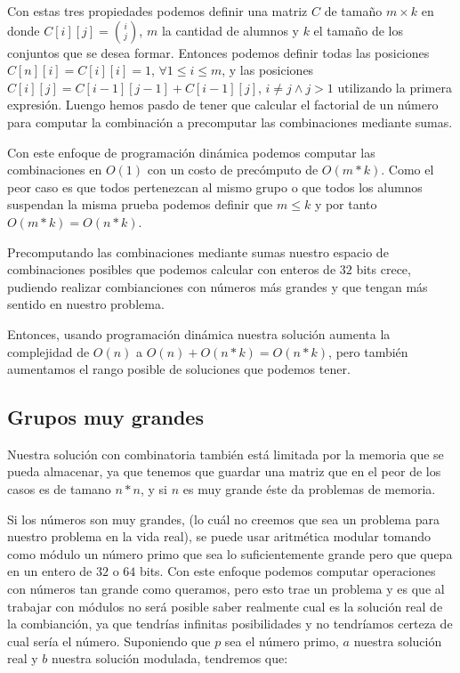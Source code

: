 \documentclass{article}
\begin{document}
Con estas tres propiedades podemos definir una matriz $C$ de tamaño $m \times k$ en donde $C[i][j] = {i \choose j}$, $m$ la cantidad de alumnos y $k$ el tamaño de los conjuntos que se desea formar. Entonces podemos definir todas las posiciones $C[n][i] = C[i][i] = 1$, $\forall 1 \leq i \leq m$, y las posiciones $C[i][j] = C[i - 1][j - 1] + C[i - 1][j]$, $i \neq j \land j > 1$ utilizando la primera expresión. Luengo hemos pasdo de tener que calcular el factorial de un número para computar la combinación a precomputar las combinaciones mediante sumas. 

Con este enfoque de programación dinámica podemos computar las combinaciones en $O(1)$ con un costo de precómputo de $O(m*k)$. Como el peor caso es que todos pertenezcan al mismo grupo o que todos los alumnos suspendan la misma prueba podemos definir que $m \leq k$ y por tanto $O(m*k) = O(n*k)$. 

Precomputando las combinaciones mediante sumas nuestro espacio de combinaciones posibles que podemos calcular con enteros de $32$ bits crece, pudiendo realizar combianciones con números más grandes y que tengan más sentido en nuestro problema.  

Entonces, usando programación dinámica nuestra solución aumenta la complejidad de $O(n)$ a $O(n) + O(n*k) = O(n*k)$, pero también aumentamos el rango posible de soluciones que podemos tener.

\subsection{Grupos muy grandes}

Nuestra solución con combinatoria también está limitada por la memoria que se pueda almacenar, ya que tenemos que guardar una matriz que en el peor de los casos es de tamano $n*n$, y si $n$ es muy grande éste da problemas de memoria.

Si los números son muy grandes, (lo cuál no creemos que sea un problema para nuestro problema en la vida real), se puede usar aritmética modular tomando como módulo un número primo que sea lo suficientemente grande pero que quepa en un entero de $32$ o $64$ bits. Con este enfoque podemos computar operaciones con números tan grande como queramos, pero esto trae un problema y es que al trabajar con módulos no será posible saber realmente cual es la solución real de la combianción, ya que tendrías infinitas posibilidades y no tendríamos certeza de cual sería el número. Suponiendo que $p$ sea el número primo, $a$ nuestra solución real y $b$ nuestra solución modulada, tendremos que:
\end{document}
